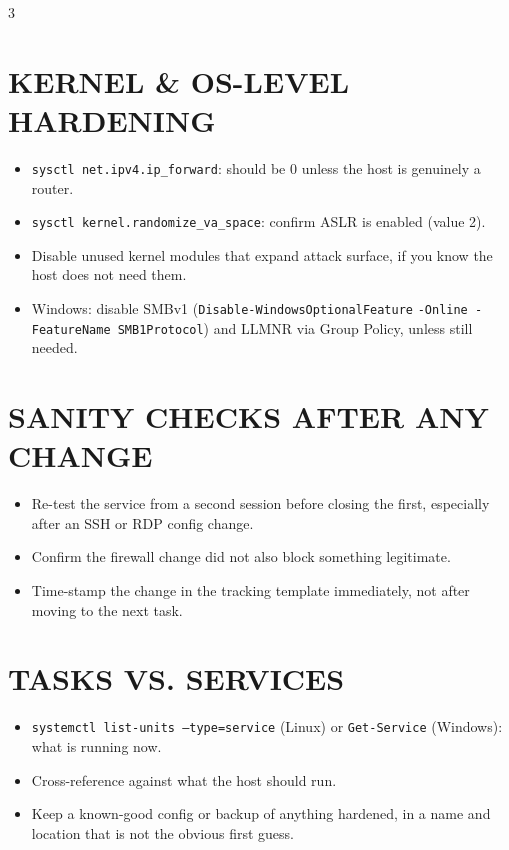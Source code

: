 \documentclass[7pt,landscape]{article}
\begin{document}
\begin{multicols*}{3}
\section{KERNEL \& OS-LEVEL HARDENING}
\begin{itemize}
    \item \texttt{sysctl net.ipv4.ip\_forward}: should be 0 unless the host is genuinely a router.
    \item \texttt{sysctl kernel.randomize\_va\_space}: confirm ASLR is enabled (value 2).
    \item Disable unused kernel modules that expand attack surface, if you know the host does not need them.
    \item \textcolor{winc}{Windows}: disable SMBv1 \newline (\texttt{Disable-WindowsOptionalFeature} \newline \texttt{-Online -FeatureName SMB1Protocol}) and LLMNR via Group Policy, unless still needed.
\end{itemize}

\section{SANITY CHECKS AFTER ANY CHANGE}
\begin{itemize}
    \item Re-test the service from a second session before closing the first, especially after an SSH or RDP config change.
    \item Confirm the firewall change did not also block something legitimate.
    \item Time-stamp the change in the tracking template immediately, not after moving to the next task.
\end{itemize}

\section{TASKS VS. SERVICES}
\begin{itemize}
    \item \texttt{systemctl list-units --type=service} \textcolor{linuxc}{(Linux)} or \texttt{Get-Service} \textcolor{winc}{(Windows)}: what is running now.
    \item Cross-reference against what the host should run.
    \item Keep a known-good config or backup of anything hardened, in a name and location that is not the obvious first guess.
\end{itemize}


\end{multicols*}
\end{document}
